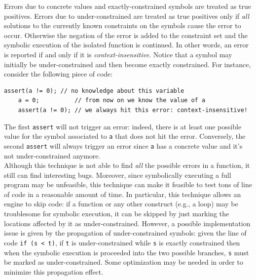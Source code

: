 Errors due to concrete values and exactly-constrained symbols are treated as true positives. Errors due to under-constrained are treated as true positives only if {\em all} solutions to the currently known constraints on the symbols cause the error to occur. Otherwise the negation of the error is added to the constraint set and the symbolic execution of the isolated function is continued. In other words, an error is reported if and only if it is {\em context-insensitive}. Notice that a symbol may initially be under-constrained and then become exactly constrained. For instance, consider the following piece of code:

    \begin{lstlisting}[basicstyle=\ttfamily\small]
    assert(a != 0); // no knowledge about this variable
    a = 0;          // from now on we know the value of a
    assert(a != 0); // we always hit this error: context-insensitive! 
    \end{lstlisting}

The first {\tt assert} will not trigger an error: indeed, there is at least one possible value for the symbol associated to {\tt a} that does not hit the error. Conversely, the second {\tt assert} will always trigger an error since {\tt a} has a concrete value and it's not under-constrained anymore.\\

Although this technique is not able to find {\em all} the possible errors in a function, it still can find interesting bugs. Moreover, since symbolically executing a full program may be unfeasible, this technique can make it feasible to test tons of line of code in a reasonable amount of time. In particular, this technique allows an engine to skip code: if a function or any other construct (e.g., a loop) may be troublesome for symbolic execution, it can be skipped by just marking the locations affected by it as under-constrained. However, a possible implementation issue is given by the propagation of under-constrained symbols: given the line of code {\tt if (s < t)}, if {\tt t} is under-constrained while {\tt s} is exactly constrained then when the symbolic execution is proceeded into the two possible branches, {\tt s} must be marked as under-constrained. Some optimization may be needed in order to minimize this propagation effect.

